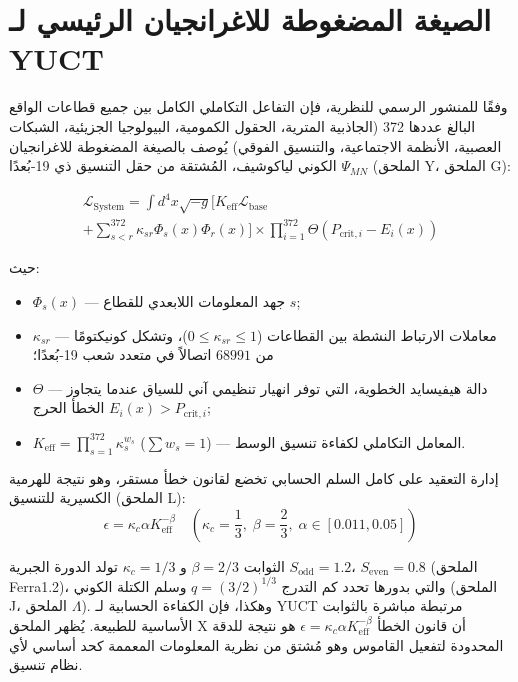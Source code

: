 \documentclass[12pt,a4paper]{article}
\begin{document}
	\section{الصيغة المضغوطة للاغرانجيان الرئيسي لـ YUCT}
	وفقًا للمنشور الرسمي للنظرية، فإن التفاعل التكاملي الكامل بين جميع قطاعات الواقع البالغ عددها 372 (الجاذبية المترية، الحقول الكمومية، البيولوجيا الجزيئية، الشبكات العصبية، الأنظمة الاجتماعية، والتنسيق الفوقي) يُوصف بالصيغة المضغوطة للاغرانجيان الكوني لياكوشيف، المُشتقة من حقل التنسيق ذي 19-بُعدًا \(\Psi_{MN}\) (الملحق Y، الملحق G):
	
	\begin{multline}
		\mathscr{L}_{\text{System}} = \int d^4x \sqrt{-g} \Bigg[ K_{\text{eff}} \mathscr{L}_{\text{base}} \\
		+ \sum_{s<r}^{372} \kappa_{sr} \Phi_s(x) \Phi_r(x) \Bigg] \times \prod_{i=1}^{372} \Theta(P_{\text{crit},i} - E_i(x))
	\end{multline}
	
	حيث:
	\begin{itemize}
		\item \(\Phi_s(x)\) — جهد المعلومات اللابعدي للقطاع \(s\);
		\item \(\kappa_{sr}\) — معاملات الارتباط النشطة بين القطاعات (\(0 \le \kappa_{sr} \le 1\))، وتشكل كونيكتومًا من \(68991\) اتصالاً في متعدد شعب 19-بُعدًا؛
		\item \(\Theta\) — دالة هيفيسايد الخطوية، التي توفر انهيار تنظيمي آني للسياق عندما يتجاوز الخطأ الحرج \(E_i(x) > P_{\text{crit},i}\);
		\item \(K_{\text{eff}} = \prod_{s=1}^{372} \kappa_s^{w_s}\) (\(\sum w_s = 1\)) — المعامل التكاملي لكفاءة تنسيق الوسط.
	\end{itemize}
	
	إدارة التعقيد على كامل السلم الحسابي تخضع لقانون خطأ مستقر، وهو نتيجة للهرمية الكسيرية للتنسيق (الملحق L):
	\begin{equation}
		\epsilon = \kappa_c \alpha K_{\text{eff}}^{-\beta} \quad \left(\kappa_c = \frac{1}{3}, \; \beta = \frac{2}{3}, \; \alpha \in [0.011, 0.05]\right)
	\end{equation}
	
	الثوابت \(\beta = 2/3\) و \(\kappa_c = 1/3\) تولد الدورة الجبرية \(S_{\mathrm{odd}} = 1.2\)، \(S_{\mathrm{even}} = 0.8\) (الملحق Ferra1.2)، والتي بدورها تحدد كم التدرج \(q = (3/2)^{1/3}\) وسلم الكتلة الكوني (الملحق J، الملحق \(\Lambda\)). وهكذا، فإن الكفاءة الحسابية لـ YUCT مرتبطة مباشرة بالثوابت الأساسية للطبيعة. يُظهر الملحق X أن قانون الخطأ \(\epsilon = \kappa_c\alpha K_{\mathrm{eff}}^{-\beta}\) هو نتيجة للدقة المحدودة لتفعيل القاموس وهو مُشتق من نظرية المعلومات المعممة كحد أساسي لأي نظام تنسيق.
	
\end{document}
